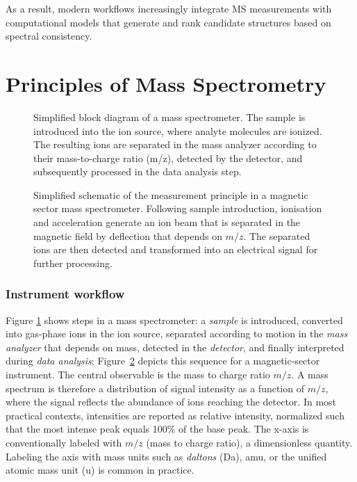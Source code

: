 As a result, modern workflows increasingly integrate MS measurements with computational models that generate and rank candidate structures based on spectral consistency.


\section{Principles of Mass Spectrometry}


\begin{figure}[H]
    \centering
    \resizebox{0.9\textwidth}{!}{}
    \caption[Simplified block diagram of a mass spectrometer]{
        Simplified block diagram of a mass spectrometer.
        The sample is introduced into the ion source, where analyte molecules are ionized.
        The resulting ions are separated in the mass analyzer according to their mass-to-charge ratio (m/z), detected by the detector, and subsequently processed in the data analysis step. \cite{wikibooks-ms-flowchart}
        }
    \label{fig:ms-flow}
\end{figure}

\begin{figure}[H]
    \centering
    \resizebox{0.9\textwidth}{!}{}
    \caption[Simplified schematic of MS measurement principle]{
        Simplified schematic of the measurement principle in a magnetic sector mass spectrometer.
        Following sample introduction, ionisation and acceleration generate an ion beam that is separated in the magnetic field by deflection that depends on $m/z$.
        The separated ions are then detected and transformed into an electrical signal for further processing. \cite{chemguide}
    }
    \label{fig:ms-schematic}
\end{figure}



\subsubsection{Instrument workflow}

Figure \ref{fig:ms-flow} shows steps in a mass spectrometer: a \emph{sample} is introduced, converted into gas-phase ions in the ion source, separated according to motion in the \emph{mass analyzer} that depends on mass, detected in the \emph{detector}, and finally interpreted during \emph{data analysis}; Figure~\ref{fig:ms-schematic} depicts this sequence for a magnetic-sector instrument.
The central observable is the mass to charge ratio $m/z$.
A mass spectrum is therefore a distribution of signal intensity as a function of $m/z$, where the signal reflects the abundance of ions reaching the detector. \cite[p.~1566]{Murray2013}
In most practical contexts, intensities are reported as relative intensity, normalized such that the most intense peak equals 100\% of the base peak.  \cite[p.~1550]{Murray2013}
The x-axis is conventionally labeled with $m/z$ (mass to charge ratio), a dimensionless quantity.
Labeling the axis with mass units such as \emph{daltons} (Da), amu, or the unified atomic mass unit (u) is common in practice. \cite[p.~1516]{Murray2013}

